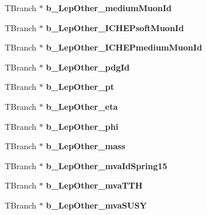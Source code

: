 \begin{DoxyCompactItemize}
\hypertarget{classMiniTree_a5bcc35b7723c05b8631cc138f8a8e656}{}\label{classMiniTree_a5bcc35b7723c05b8631cc138f8a8e656} 
T\+Branch $\ast$ {\bfseries b\+\_\+\+Lep\+Other\+\_\+medium\+Muon\+Id}
\item 
\hypertarget{classMiniTree_a1458ec70b47484a35e4b9467d2d33cd6}{}\label{classMiniTree_a1458ec70b47484a35e4b9467d2d33cd6} 
T\+Branch $\ast$ {\bfseries b\+\_\+\+Lep\+Other\+\_\+\+I\+C\+H\+E\+Psoft\+Muon\+Id}
\item 
\hypertarget{classMiniTree_abef67e5ea86da441400e0d1196bc3e8a}{}\label{classMiniTree_abef67e5ea86da441400e0d1196bc3e8a} 
T\+Branch $\ast$ {\bfseries b\+\_\+\+Lep\+Other\+\_\+\+I\+C\+H\+E\+Pmedium\+Muon\+Id}
\item 
\hypertarget{classMiniTree_a90c74a078e53a29e35ca1f0a5ed39d33}{}\label{classMiniTree_a90c74a078e53a29e35ca1f0a5ed39d33} 
T\+Branch $\ast$ {\bfseries b\+\_\+\+Lep\+Other\+\_\+pdg\+Id}
\item 
\hypertarget{classMiniTree_a20a0c5ad71d5b3406f8ada32cacc13d1}{}\label{classMiniTree_a20a0c5ad71d5b3406f8ada32cacc13d1} 
T\+Branch $\ast$ {\bfseries b\+\_\+\+Lep\+Other\+\_\+pt}
\item 
\hypertarget{classMiniTree_a1fd89756e199685384b5db5dd85ed4b5}{}\label{classMiniTree_a1fd89756e199685384b5db5dd85ed4b5} 
T\+Branch $\ast$ {\bfseries b\+\_\+\+Lep\+Other\+\_\+eta}
\item 
\hypertarget{classMiniTree_a4fd4e49639a9257d9e8ac0a9889ba721}{}\label{classMiniTree_a4fd4e49639a9257d9e8ac0a9889ba721} 
T\+Branch $\ast$ {\bfseries b\+\_\+\+Lep\+Other\+\_\+phi}
\item 
\hypertarget{classMiniTree_a0cdcd80cc0f3b54e22012b1a90676056}{}\label{classMiniTree_a0cdcd80cc0f3b54e22012b1a90676056} 
T\+Branch $\ast$ {\bfseries b\+\_\+\+Lep\+Other\+\_\+mass}
\item 
\hypertarget{classMiniTree_a42edad556bf0550e539efe692ba65522}{}\label{classMiniTree_a42edad556bf0550e539efe692ba65522} 
T\+Branch $\ast$ {\bfseries b\+\_\+\+Lep\+Other\+\_\+mva\+Id\+Spring15}
\item 
\hypertarget{classMiniTree_abb29c7f718b76a6fef8546657b3999d5}{}\label{classMiniTree_abb29c7f718b76a6fef8546657b3999d5} 
T\+Branch $\ast$ {\bfseries b\+\_\+\+Lep\+Other\+\_\+mva\+T\+TH}
\item 
\hypertarget{classMiniTree_a84c60acbff23a05280128e5b23326b1c}{}\label{classMiniTree_a84c60acbff23a05280128e5b23326b1c} 
T\+Branch $\ast$ {\bfseries b\+\_\+\+Lep\+Other\+\_\+mva\+S\+U\+SY}
\item 
\hypertarget{classMiniTree_a5f3f996cef5f74356bfc377d3ed0b386}{}\label{classMiniTree_a5f3f996cef5f74356bfc377d3ed0b386} 

\end{DoxyCompactItemize}

